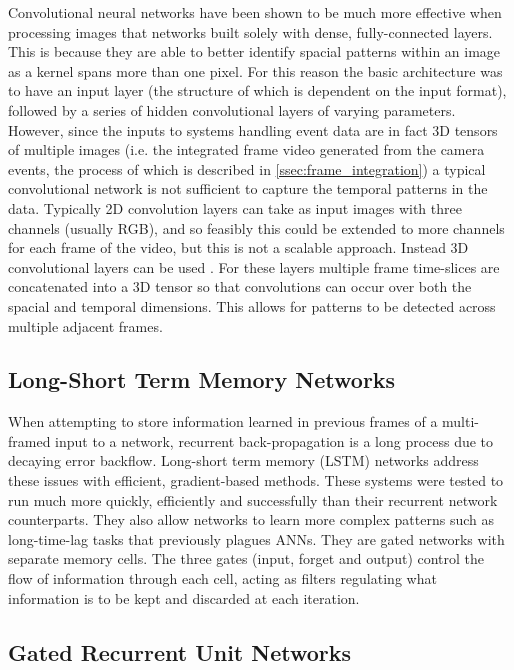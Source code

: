 Convolutional neural networks have been shown to be much more effective when processing images that networks built solely with dense, fully-connected layers. This is because they are able to better identify spacial patterns within an image as a kernel spans more than one pixel. For this reason the basic architecture was to have an input layer (the structure of which is dependent on the input format), followed by a series of hidden convolutional layers of varying parameters.
However, since the inputs to systems handling event data are in fact 3D tensors of multiple images (i.e. the integrated frame video generated from the camera events, the process of which is described in \cref{ssec:frame_integration}) a typical convolutional network is not sufficient to capture the temporal patterns in the data. Typically 2D convolution layers can take as input images with three channels (usually RGB), and so feasibly this could be extended to more channels for each frame of the video, but this is not a scalable approach. Instead 3D convolutional layers can be used \cite{3DConv}. For these layers multiple frame time-slices are concatenated into a 3D tensor so that convolutions can occur over both the spacial and temporal dimensions. This allows for patterns to be detected across multiple adjacent frames.

\subsection{Long-Short Term Memory Networks}

When attempting to store information learned in previous frames of a multi-framed input to a network, recurrent back-propagation is a long process due to decaying error backflow. Long-short term memory (LSTM) networks\cite{LSTM} address these issues with efficient, gradient-based methods. These systems were tested to run much more quickly, efficiently and successfully than their recurrent network counterparts. They also allow networks to learn more complex patterns such as long-time-lag tasks that previously plagues ANNs. They are gated networks with separate memory cells. The three gates (input, forget and output) control the flow of information through each cell, acting as filters regulating what information is to be kept and discarded at each iteration.

\subsection{Gated Recurrent Unit Networks}

